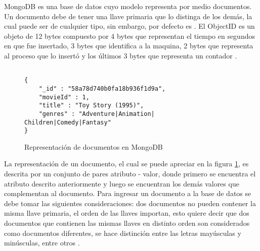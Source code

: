 \documentclass[conference,compsoc]{sty/IEEEtran}
\begin{document}
MongoDB es una base de datos cuyo modelo representa por medio documentos. Un documento debe de tener una llave primaria  que lo distinga de los demás, la cual puede ser de cualquier tipo, sin embargo, por defecto es . El ObjectID es un objeto de 12 bytes compuesto por 4 bytes que representan el tiempo en segundos en que fue insertado, 3 bytes que identifica a la maquina, 2 bytes que representa al proceso que lo insertó y los últimos 3 bytes que representa un contador \cite{ObjectId}. 

\begin{figure}
    \begin{verbatim}
               
{
	"_id" : "58a78d740b0fa18b936f1d9a",
	"movieId" : 1,
	"title" : "Toy Story (1995)",
	"genres" : "Adventure|Animation| Children|Comedy|Fantasy"
}

\end{verbatim}
\caption{Representación de documentos en MongoDB} 
\label{fig:documento-mongo}
\end{figure}

La representación de un documento, el cual se puede apreciar en la figura \ref{fig:documento-mongo}, es descrita por un conjunto de pares atributo - valor, donde primero se encuentra el atributo  descrito anteriormente y luego se encuentran los demás valores que complementan al documento. Para ingresar un documento a la base de datos se debe tomar las siguientes consideraciones: dos documentos no pueden contener la misma llave primaria, el orden de las llaves importan, esto quiere decir que dos documentos que contienen las mismas llaves en distinto orden son considerados como documentos diferentes, se hace distinción entre las letras mayúsculas y minúsculas, entre otros \cite{Chodorow}.







    

\end{document}
